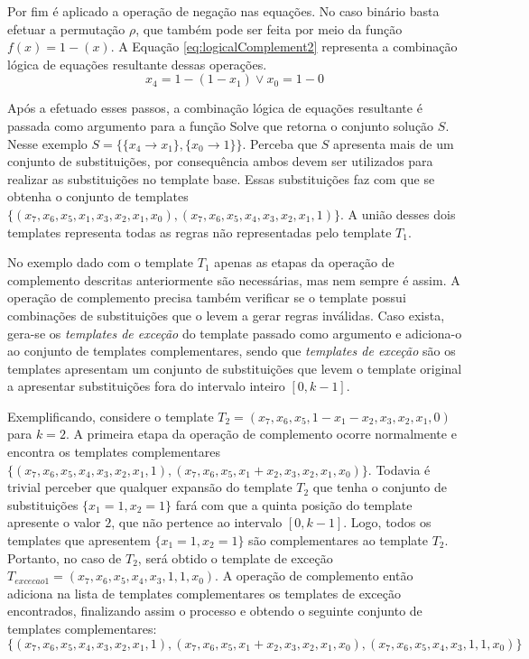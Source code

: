 Por fim é aplicado a operação de negação nas equações. No caso binário basta efetuar a permutação $\rho $, que também pode ser feita por meio da função $f(x) = 1 - (x)$. A Equação \ref{eq:logicalComplement2} representa a combinação lógica de equações resultante dessas operações.
\begin{equation}
x_4 = 1 - (1 - x_1) \vee  
x_0 = 1 - 0
\label{eq:logicalComplement2}
\end{equation}

Após a efetuado esses passos, a combinação lógica de equações resultante é passada como argumento para a função Solve que retorna o conjunto solução $S$. Nesse exemplo $S = \{\{x_4 \to x_1\},\{x_0\to 1\}\}$. Perceba que $S$ apresenta mais de um conjunto de substituições, por consequência ambos devem ser utilizados para realizar as substituições no template base. Essas substituições faz com que se obtenha o conjunto de templates $\{(x_7,x_6,x_5,x_1,x_3,x_2,x_1,x_0),(x_7,x_6,x_5,x_4,x_3,x_2,x_1,1)\}$. A união desses dois templates representa todas as regras não representadas pelo template $T_1$.

No exemplo dado com o template $T_1$ apenas as etapas da operação de complemento descritas anteriormente são necessárias, mas nem sempre é assim. 
A operação de complemento precisa também verificar se o template possui combinações de substituições que o levem a gerar regras inválidas. 
Caso exista, gera-se os \textit{templates de exceção} do template passado como argumento e adiciona-o ao conjunto de templates complementares, sendo que \textit{templates de exceção} são os templates apresentam um conjunto de substituições que levem o template original a apresentar substituições fora do intervalo inteiro $[0, k-1]$.

Exemplificando, considere o template $T_2 = (x_7, x_6, x_5, 1 - x_1 - x_2, x_3, x_2, x_1, 0)$ para $k=2$.
A primeira etapa da operação de complemento ocorre normalmente e encontra os templates complementares $\{(x_7, x_6, x_5, x_4, x_3, x_2, x_1, 1),(x_7, x_6, x_5, x_1 + x_2, x_3, x_2, x_1, x_0)\}$.
Todavia é trivial perceber que qualquer expansão do template $T_2$ que tenha o conjunto de substituições $\{x_1 = 1, x_2 = 1\}$ fará com que a quinta posição do template apresente o valor $2$, que não pertence ao intervalo $[0,k-1]$.
Logo, todos os templates que apresentem $\{x_1 = 1, x_2 = 1\}$ são complementares ao template $T_2$.
Portanto, no caso de $T_2$, será obtido o template de exceção $T_{excecao 1} = (x_7, x_6, x_5, x_4, x_3, 1, 1, x_0)$. 
A operação de complemento então adiciona na lista de templates complementares os templates de exceção encontrados, finalizando assim o processo e obtendo o seguinte conjunto de templates complementares:
\begin{equation}
\{(x_7, x_6, x_5, x_4, x_3, x_2, x_1, 1),(x_7, x_6, x_5, x_1 + x_2, x_3, x_2, x_1, x_0),(x_7, x_6, x_5, x_4, x_3, 1, 1, x_0)\}
\label{eq:complementionSet}
\end{equation}

